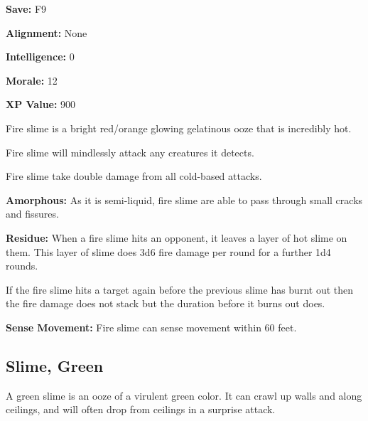 \begin{multicols*}{2}
{\textbf{Save:} F9

\textbf{Alignment:} None

\textbf{Intelligence:} 0

\textbf{Morale:} 12

\textbf{XP Value:} 900}

Fire slime is a bright red/orange glowing gelatinous ooze that is incredibly hot.

Fire slime will mindlessly attack any creatures it detects.

Fire slime take double damage from all cold-based attacks.

\textbf{Amorphous:} As it is semi-liquid, fire slime are able to pass through small cracks and fissures.

\textbf{Residue:} When a fire slime hits an opponent, it leaves a layer of hot slime on them. This layer of slime does 3d6 fire damage per round for a further 1d4 rounds.

If the fire slime hits a target again before the previous slime has burnt out then the fire damage does not stack but the duration before it burns out does.

\textbf{Sense Movement:} Fire slime can sense movement within 60 feet.

\subsection{Slime, Green}

A green slime is an ooze of a virulent green color. It can crawl up walls and along ceilings, and will often drop from ceilings in a surprise attack.


\end{multicols*}
